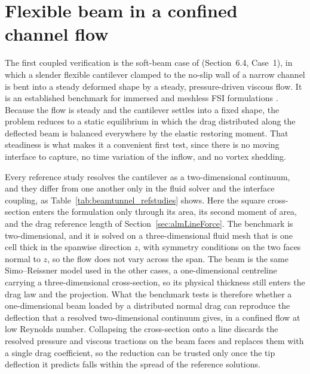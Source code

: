 \section{Flexible beam in a confined channel flow}
\label{sec:beamtunnel}

\noindent
The first coupled verification is the soft-beam case of \citet{zhang_immersed_2012} (Section~6.4, Case~1), in which a slender flexible cantilever clamped to the no-slip wall of a narrow channel is bent into a steady deformed shape by a steady, pressure-driven viscous flow. It is an established benchmark for immersed and meshless FSI formulations \citep{long_coupling_esfem_sph_2021,wang_immersed_esfem_2022,yang_peridynamics_iblbm_2022,yan_explicit_velocity_iblbm_2023}. Because the flow is steady and the cantilever settles into a fixed shape, the problem reduces to a static equilibrium in which the drag distributed along the deflected beam is balanced everywhere by the elastic restoring moment. That steadiness is what makes it a convenient first test, since there is no moving interface to capture, no time variation of the inflow, and no vortex shedding.

\noindent
Every reference study resolves the cantilever as a two-dimensional continuum, and they differ from one another only in the fluid solver and the interface coupling, as Table~\ref{tab:beamtunnel_refstudies} shows. Here the square cross-section enters the formulation only through its area, its second moment of area, and the drag reference length of Section~\ref{sec:almLineForce}. The benchmark is two-dimensional, and it is solved on a three-dimensional fluid mesh that is one cell thick in the spanwise direction $z$, with symmetry conditions on the two faces normal to $z$, so the flow does not vary across the span. The beam is the same Simo--Reissner model used in the other cases, a one-dimensional centreline carrying a three-dimensional cross-section, so its physical thickness still enters the drag law and the projection. What the benchmark tests is therefore whether a one-dimensional beam loaded by a distributed normal drag can reproduce the deflection that a resolved two-dimensional continuum gives, in a confined flow at low Reynolds number. Collapsing the cross-section onto a line discards the resolved pressure and viscous tractions on the beam faces and replaces them with a single drag coefficient, so the reduction can be trusted only once the tip deflection it predicts falls within the spread of the reference solutions.

